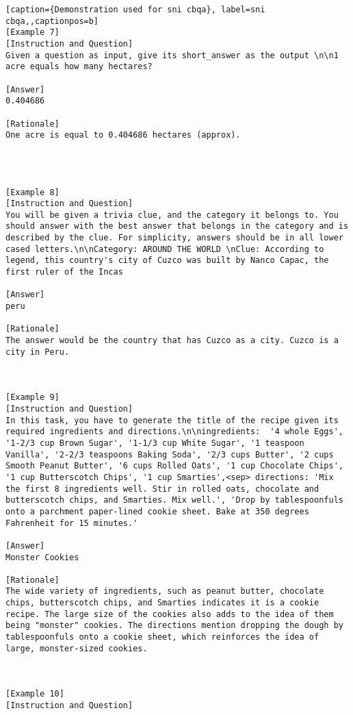 \begin{lstlisting}[caption={Demonstration used for sni cbqa}, label=sni cbqa,,captionpos=b]
[Example 7]
[Instruction and Question]
Given a question as input, give its short_answer as the output \n\n1 acre equals how many hectares?

[Answer]
0.404686

[Rationale]
One acre is equal to 0.404686 hectares (approx).




[Example 8]
[Instruction and Question]
You will be given a trivia clue, and the category it belongs to. You should answer with the best answer that belongs in the category and is described by the clue. For simplicity, answers should be in all lower cased letters.\n\nCategory: AROUND THE WORLD \nClue: According to legend, this country's city of Cuzco was built by Nanco Capac, the first ruler of the Incas

[Answer]
peru

[Rationale]
The answer would be the country that has Cuzco as a city. Cuzco is a city in Peru.



[Example 9]
[Instruction and Question]
In this task, you have to generate the title of the recipe given its required ingredients and directions.\n\ningredients:  '4 whole Eggs', '1-2/3 cup Brown Sugar', '1-1/3 cup White Sugar', '1 teaspoon Vanilla', '2-2/3 teaspoons Baking Soda', '2/3 cups Butter', '2 cups Smooth Peanut Butter', '6 cups Rolled Oats', '1 cup Chocolate Chips', '1 cup Butterscotch Chips', '1 cup Smarties',<sep> directions: 'Mix the first 8 ingredients well. Stir in rolled oats, chocolate and butterscotch chips, and Smarties. Mix well.', 'Drop by tablespoonfuls onto a parchment paper-lined cookie sheet. Bake at 350 degrees Fahrenheit for 15 minutes.'

[Answer]
Monster Cookies

[Rationale]
The wide variety of ingredients, such as peanut butter, chocolate chips, butterscotch chips, and Smarties indicates it is a cookie recipe. The large size of the cookies also adds to the idea of them being "monster" cookies. The directions mention dropping the dough by tablespoonfuls onto a cookie sheet, which reinforces the idea of large, monster-sized cookies.



[Example 10]
[Instruction and Question]

    \end{lstlisting}
    






